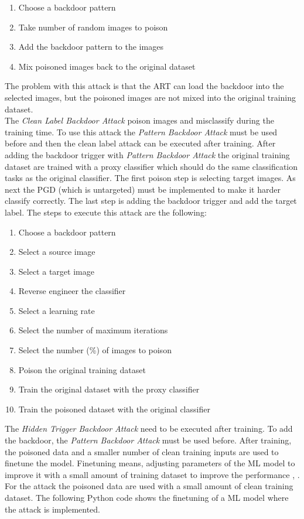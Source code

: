 \begin{enumerate}
  \item Choose a backdoor pattern
  \item Take number of random images to poison
  \item Add the backdoor pattern to the images
  \item Mix poisoned images back to the original dataset
\end{enumerate}

The problem with this attack is that the ART can load the backdoor into the selected images, but the poisoned images are not mixed into the original training dataset. \\
The \textit{Clean Label Backdoor Attack} \cite{turner2018clean} poison images and misclassify during the training time. To use this attack the \textit{Pattern Backdoor Attack} must be
used before and then the clean label attack can be executed after training. After adding the backdoor trigger with \textit{Pattern Backdoor Attack} the original training dataset are trained
with a proxy classifier which should do the same classification tasks as the original classifier. The first poison step is selecting target images. As next the PGD (which is untargeted)
must be implemented to make it harder classify correctly. The last step is adding the backdoor trigger and add the target label. The steps to execute this attack are the following: \\

\begin{enumerate}
  \item Choose a backdoor pattern
  \item Select a source image
  \item Select a target image
  \item Reverse engineer the classifier
  \item Select a learning rate
  \item Select the number of maximum iterations
  \item Select the number (\%) of images to poison
  \item Poison the original training dataset
  \item Train the original dataset with the proxy classifier
  \item Train the poisoned dataset with the original classifier
\end{enumerate}

The \textit{Hidden Trigger Backdoor Attack} \cite{DBLP:journals/corr/abs-1910-00033} need to be executed after training. To add the backdoor, the \textit{Pattern Backdoor Attack} must be
used before. After training, the poisoned data and a smaller number of clean training inputs are used to finetune the model. Finetuning means, adjusting parameters of the ML model to
improve it with a small amount of training dataset to improve the performance \cite{DBLP:conf/acl/LiWTTTPBCA20}, \cite{DBLP:journals/corr/abs-2112-08691}. For the attack the poisoned data
are used with a small amount of clean training dataset. The following Python code shows the finetuning of a ML model where the attack is implemented.

